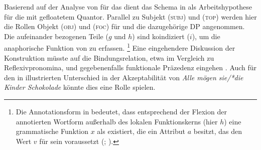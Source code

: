 Basierend auf der Analyse von \citet{spector2009} für das  dient das
Schema in  als Arbeits\-hypothese für die
 mit gefloatetem Quantor. Parallel zu Subjekt (\textsc{subj}) und
 (\textsc{top}) werden hier die Rollen Objekt (\textsc{obj}) und
 (\textsc{foc}) für  und die dazugehörige
DP angenommen. Die aufeinander bezogenen Teile ($g$ und
$h$) sind koindiziert ($i$), um die anaphorische
Funktion von  zu erfassen.%
%
	\footnote{Die Annotationsform
		 in 
		bedeutet, dass entsprechend der Flexion der annotierten Wortform
		außerhalb des lokalen Funktionskerns (hier $h$) eine grammatische
		Funktion $x$ als  existiert, die ein Attribut $a$
		besitzt, das den Wert $v$ für sein  voraussetzt
		(;
		\cite[66--70]{bresnanetal2016}).}
%
Eine eingehendere Diskussion der Konstruktion müsste auf die
Bindungsrelation, etwa im Vergleich zu
Reflexivpronomina, und gegebenenfalls funktionale
Präzedenz eingehen \autocite[vgl.][213,
254--285]{bresnanetal2016}. Auch für den in  illustrierten
Unterschied in der Akzeptabilität von \textit{Alle mögen sie/*die Kinder
Schokolade} könnte dies eine Rolle spielen.

